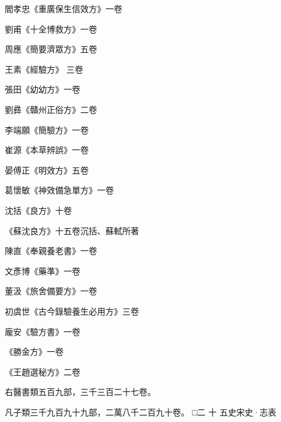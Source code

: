 \begin{pinyinscope}
 閻孝忠《重廣保生信效方》一卷



 劉甫《十全博救方》一卷



 周應《簡要濟眾方》五卷



 王素《經驗方》
 三卷



 張田《幼幼方》一卷



 劉彞《贛州正俗方》二卷



 李端願《簡驗方》一卷



 崔源《本草辨誤》一卷



 晏傅正《明效方》五卷



 葛懷敏《神效備急單方》一卷



 沈括《良方》十卷



 《蘇沈良方》十五卷沉括、蘇軾所著



 陳直《奉親養老書》一卷



 文彥博《藥準》一卷



 董汲《旅舍備要方》一卷



 初虞世《古今錄驗養生必用方》三卷



 龐安《驗方書》一卷



 《勝金方》一卷



 《王趙選秘方》二卷



 右醫書類五百九部，三千三百二十七卷。



 凡子類三千九百九十九部，二萬八千二百九十卷。
 □二
 十
 五史宋史·志表



\end{pinyinscope}